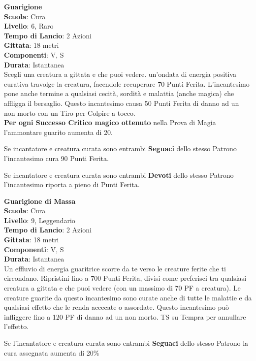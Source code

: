 \begin{multicols}{2}
\medskip\textbf{Guarigione}\\
\textbf{Scuola}: Cura\\
\textbf{Livello}: 6, Raro\\
\textbf{Tempo di Lancio}: 2 Azioni\\
\textbf{Gittata}: 18 metri\\
\textbf{Componenti}: V, S\\
\textbf{Durata}: Istantanea\\
Scegli una creatura a gittata e che puoi vedere. un'ondata di energia positiva curativa travolge la creatura, facendole recuperare 70 Punti Ferita. L'incantesimo pone anche termine a qualsiasi cecità, sordità e malattia (anche magica) che affligga il bersaglio. Questo incantesimo causa 50 Punti Ferita di danno ad un non morto con un Tiro per Colpire a tocco.\\
\textbf{Per ogni Successo Critico magico ottenuto} nella Prova di Magia l'ammontare guarito aumenta di 20.

Se incantatore e creatura curata sono entrambi \textbf{Seguaci} dello stesso Patrono l'incantesimo cura 90 Punti Ferita.

Se incantatore e creatura curata sono entrambi \textbf{Devoti} dello stesso Patrono l'incantesimo riporta a pieno di Punti Ferita.

\medskip\textbf{Guarigione di Massa}\\
\textbf{Scuola}: Cura\\
\textbf{Livello}: 9, Leggendario\\
\textbf{Tempo di Lancio}: 2 Azioni\\
\textbf{Gittata}: 18 metri\\
\textbf{Componenti}: V, S\\
\textbf{Durata}: Istantanea\\
Un effluvio di energia guaritrice scorre da te verso le creature ferite che ti circondano. Ripristini fino a 700 Punti Ferita, divisi come preferisci tra qualsiasi creatura a gittata e che puoi vedere (con un massimo di 70 PF a creatura). Le creature guarite da questo incantesimo sono curate anche di tutte le malattie e da qualsiasi effetto che le renda accecate o assordate. Questo incantesimo può infliggere fino a 120 PF di danno ad un non morto. TS su Tempra per annullare l'effetto.

Se l'incantatore e creatura curata sono entrambi \textbf{Seguaci} dello stesso Patrono la cura assegnata aumenta di 20\%


\end{multicols}
